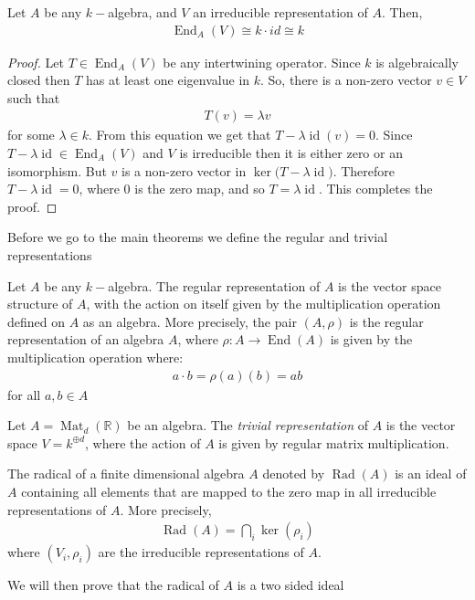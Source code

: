 \begin{lemma}
    Let $A$ be any $k-$algebra, and $V$ an irreducible representation of $A$. Then,
    \begin{align*}
        \operatorname{End}_A (V) \cong k \cdot id \cong k
    \end{align*}
\end{lemma}
\begin{proof}
    Let $T \in \operatorname{End}_A(V)$ be any intertwining operator. Since $k$ is algebraically closed then $T$ has at least one eigenvalue in $k$. So, there is a non-zero vector $v \in V$ such that
    \begin{align*}
        T(v) = \lambda v
    \end{align*}
    for some $\lambda \in k$. From this equation we get that $T -\lambda \operatorname{id} (v) = 0 $. Since $T -\lambda \operatorname{id} \in \operatorname{End}_A(V)$ and $V$ is irreducible then it is either zero or an isomorphism. But $v$ is a non-zero vector in $\ker\big(T -\lambda \operatorname{id}\big) $. Therefore $T -\lambda \operatorname{id} = 0$, where $0$ is the zero map, and so $T = \lambda \operatorname{id}$. This completes the proof.
\end{proof}
Before we go to the main theorems we define the regular and trivial representations

\begin{definition}
    Let $A$ be any $k-$algebra. The regular representation of $A$ is the vector space structure of $A$, with the action on itself given by the multiplication operation defined on $A$ as an algebra.
More precisely, the pair $(A, \rho)$ is the regular representation of an algebra $A$, where $\rho: A \to \operatorname{End}(A)$ is given by the multiplication operation where:
\begin{align*}
    a \cdot b = \rho(a)(b) = ab
\end{align*}
for all $a,b \in A$
\end{definition}

\begin{definition}
    Let $A = \operatorname{Mat}_d(\mathbb{R})$ be an algebra. The \emph{trivial representation} of $A$ is the vector space $V = k^{\oplus d}$, where the action of $A$ is given by regular matrix multiplication.

\end{definition}

\begin{definition}[Radical]
    The radical of a finite dimensional algebra $A$ denoted by $\operatorname{Rad}(A)$ is an ideal of $A$ containing all elements that are mapped to the zero map in all irreducible representations of $A$. More precisely,
    \begin{align*}
        \operatorname{Rad}(A) = \bigcap_i \ker(\rho_i)
    \end{align*}
    where $(V_i, \rho_i)$ are the irreducible representations of $A$.
\end{definition}
We will then prove that the radical of $A$ is a two sided ideal

